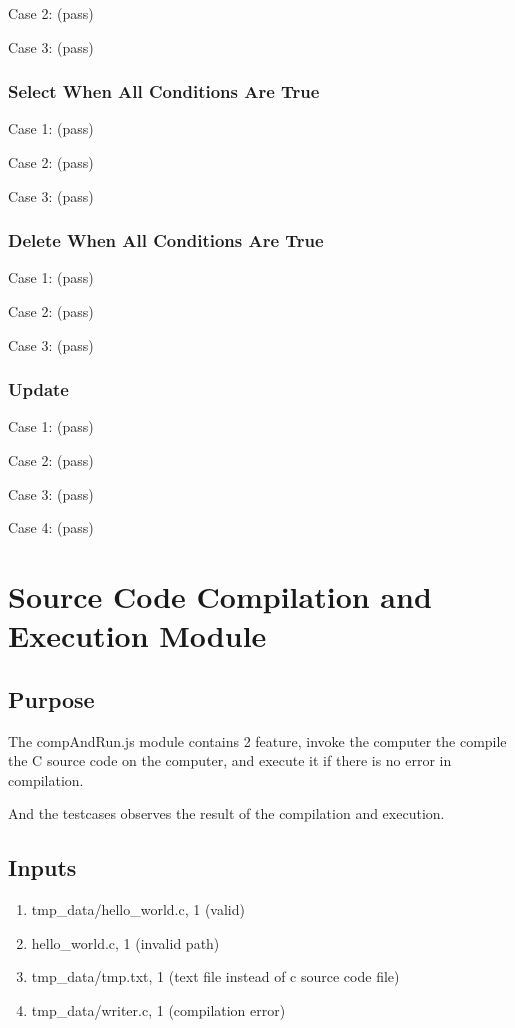 Case 2: (pass)


Case 3: (pass)


\subsubsection{Select When All Conditions Are True}
Case 1: (pass)


Case 2: (pass)


Case 3: (pass)


\subsubsection{Delete When All Conditions Are True}
Case 1: (pass)


Case 2: (pass)


Case 3: (pass)


\subsubsection{Update}
Case 1: (pass)


Case 2: (pass)


Case 3: (pass)


Case 4: (pass)


\section{Source Code Compilation and Execution Module}
\subsection{Purpose}
The compAndRun.js module contains 2 feature, invoke the computer the compile the C source code on the computer, and execute it if there is no error in compilation.

And the testcases observes the result of the compilation and execution.

\subsection{Inputs}
\begin{enumerate}
  \item tmp\_data/hello\_world.c, 1 (valid)
  \item hello\_world.c, 1 (invalid path)
  \item tmp\_data/tmp.txt, 1 (text file instead of c source code file)
  \item tmp\_data/writer.c, 1 (compilation error)
\end{enumerate}

